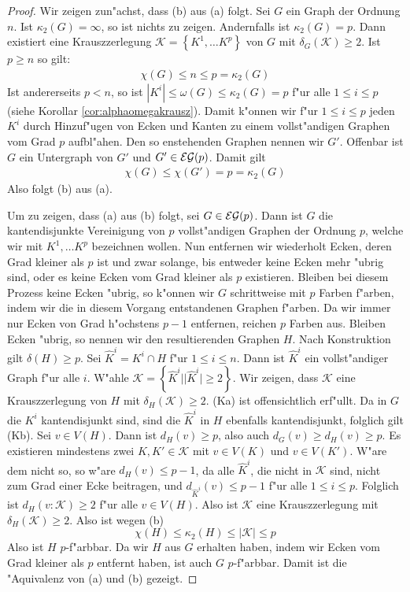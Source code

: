 \begin{proof}
  Wir zeigen zun"achst, dass (b) aus (a) folgt. Sei $G$ ein Graph der Ordnung $n$. Ist $\kappa_{2}(G) = \infty$, so ist nichts zu zeigen. Andernfalls ist $\kappa_{2}(G) =p$. Dann existiert eine Krauszzerlegung $\mathcal{K} = \left\{ K^1,\dots K^p \right\}$ von $G$ mit $\delta_G(\mathcal{K}) \geq 2$. Ist $p \geq n$ so gilt:
  \begin{align*}
    \chi(G) \leq n \leq p = \kappa_2 (G)
  \end{align*}
  Ist andererseits $p< n $, so ist $|K^{i}| \leq \omega (G)  \leq \kappa_2 (G) =  p$ f"ur alle $1\leq i \leq p$ (siehe Korollar \ref{cor:alphaomegakrausz}). Damit k"onnen wir f"ur $1\leq i \leq p$ jeden $K^{i}$ durch Hinzuf"ugen von Ecken und Kanten zu einem vollst"andigen Graphen vom Grad $p$ aufbl"ahen. Den so enstehenden Graphen nennen wir $G'$. Offenbar ist $G$ ein Untergraph von $G'$ und $G'\in {\cal EG}(p)$. Damit gilt 
  \begin{align*}
    \chi(G) \leq \chi (G') = p = \kappa_{2}(G)
  \end{align*}
  Also folgt (b) aus (a).  

  Um zu zeigen, dass (a) aus (b) folgt, sei $G\in {\cal EG}(p) $. Dann ist $G$ die kantendisjunkte Vereinigung von $p$ vollst"andigen Graphen der Ordnung $p$, welche wir mit $K^{1},\dots K^{p}$ bezeichnen wollen. Nun entfernen wir wiederholt Ecken,  deren Grad kleiner als $p$ ist und zwar solange, bis entweder keine Ecken mehr "ubrig sind, oder es keine Ecken vom Grad kleiner als $p$ existieren. 
  Bleiben bei diesem Prozess keine Ecken "ubrig, so k"onnen wir $G$ schrittweise mit $p$ Farben f"arben, indem wir die in diesem Vorgang entstandenen Graphen f"arben. Da wir immer nur Ecken von Grad h"ochstens $p-1$ entfernen, reichen $p$ Farben aus.
  Bleiben Ecken "ubrig, so nennen wir den resultierenden Graphen $H$. Nach Konstruktion gilt $\delta(H) \geq p$. Sei $\hat{K}^i = K^{i} \cap H$ f"ur $1\leq i \leq n$. Dann ist $\hat{K}^i$ ein vollst"andiger Graph f"ur alle $i$. W"ahle $\mathcal{K} = \left\{ \hat{K}^i | | \hat{K}^i| \geq 2  \right\}$. Wir zeigen, dass $\mathcal{K}$ eine Krauszzerlegung von $H$ mit $\delta_{H}(\mathcal{K}) \geq 2$.
  (Ka) ist offensichtlich erf"ullt. Da in $G$ die $K^{i}$ kantendisjunkt sind, sind die $\hat{K}^{i}$ in $H$ ebenfalls kantendisjunkt, folglich gilt (Kb). Sei $v\in V(H)$. Dann ist $d_{H}(v) \geq p$, also auch $d_{G}(v) \geq d_H(v) \geq p$. 
  Es existieren mindestens zwei $K,K' \in \mathcal{K}$ mit $v\in V(K)$ und $v\in V(K')$. W"are dem nicht so, so w"are $d_{H}(v) \leq p-1$, da alle $\hat{K}^{i}$, die nicht in $\mathcal{K}$ sind, nicht zum Grad einer Ecke beitragen, und $d_{\hat{K}^{i}} (v) \leq p-1$ f"ur alle $1 \leq i \leq p$.
  Folglich ist $d_{H}(v:\mathcal{K}) \geq 2$ f"ur alle $v \in V(H)$. Also ist $\mathcal{K}$ eine Krauszzerlegung mit $\delta_{H}(\mathcal{K}) \geq 2$. Also ist wegen (b)
  \begin{equation*}
    \chi(H) \leq \kappa_{2}(H) \leq |\mathcal{K}| \leq p
  \end{equation*}
  Also ist $H$ $p$-f"arbbar. Da wir $H$ aus $G$ erhalten haben, indem wir Ecken vom Grad kleiner als $p$ entfernt haben, ist auch $G$ $p$-f"arbbar. 
  Damit ist die "Aquivalenz von (a) und (b) gezeigt. 
  

\end{proof}
